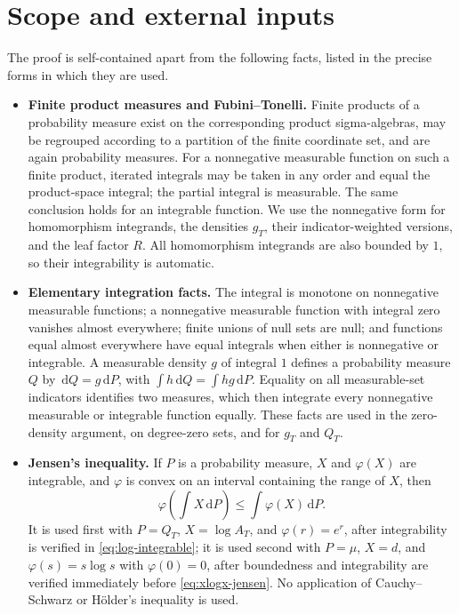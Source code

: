 \documentclass[11pt]{article}
\newcommand{\dd}{\,\mathrm{d}}
\begin{document}
\section{Scope and external inputs}

The proof is self-contained apart from the following facts, listed in
the precise forms in which they are used.

\small

\begin{itemize}
\item \textbf{Finite product measures and Fubini--Tonelli.}
Finite products of a probability measure exist on the corresponding
product sigma-algebras, may be regrouped according to a partition of
the finite coordinate set, and are again probability measures.
For a nonnegative measurable function on such a finite product, iterated
integrals may be taken in any order and equal the product-space integral;
the partial integral is measurable.  The same conclusion holds for an
integrable function.  We use the nonnegative form for homomorphism
integrands, the densities $g_T$, their indicator-weighted versions, and
the leaf factor $R$.  All homomorphism integrands are also bounded by
$1$, so their integrability is automatic.

\item \textbf{Elementary integration facts.}
The integral is monotone on nonnegative measurable functions; a
nonnegative measurable function with integral zero vanishes almost
everywhere; finite unions of null sets are null; and functions equal
almost everywhere have equal integrals when either is nonnegative or
integrable.  A measurable density $g$ of integral $1$ defines a
probability measure $Q$ by $\dd Q=g\dd P$, with
$\int h\dd Q=\int hg\dd P$.  Equality on all measurable-set indicators
identifies two measures, which then integrate every nonnegative
measurable or integrable function equally.  These facts are used in the
zero-density argument, on degree-zero sets, and for $g_T$ and $Q_T$.

\item \textbf{Jensen's inequality.}
If $P$ is a probability measure, $X$ and $\varphi(X)$ are integrable,
and $\varphi$ is convex on an interval containing the range of $X$, then
\[
\varphi\!\left(\int X\dd P\right)
\leq\int\varphi(X)\dd P.
\]
It is used first with $P=Q_T$, $X=\log A_T$, and
$\varphi(r)=e^r$, after integrability is verified in
\eqref{eq:log-integrable}; it is used second with $P=\mu$, $X=d$, and
$\varphi(s)=s\log s$ with $\varphi(0)=0$, after boundedness and
integrability are verified immediately before
\eqref{eq:xlogx-jensen}.  No application of Cauchy--Schwarz or
H\"older's inequality is used.


\end{itemize}
\end{document}
